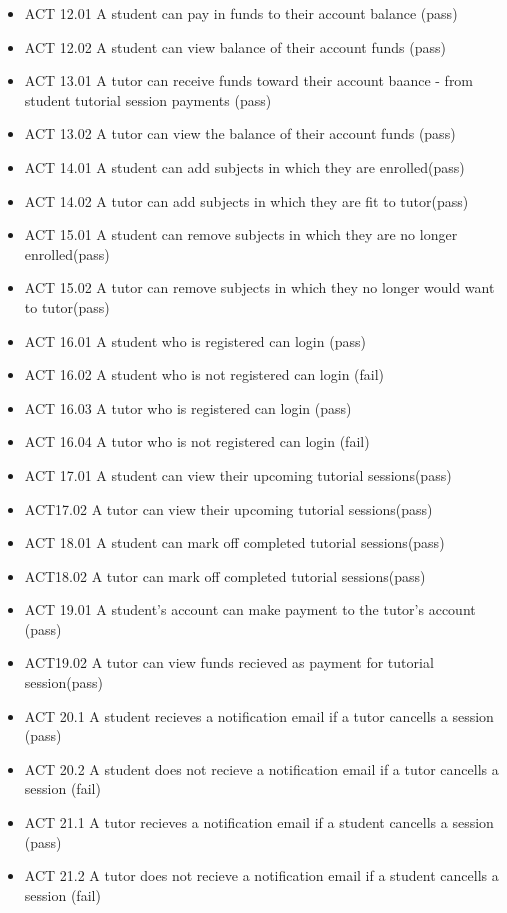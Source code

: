 \documentclass[12pt]{article}
\begin{document}
\begin{itemize}
\item ACT 12.01 A student can pay in funds to their account balance (pass)
\item ACT 12.02 A student can view balance of their account funds (pass)
\item ACT 13.01 A tutor can receive funds toward their account baance - from student tutorial session payments (pass)
\item ACT 13.02 A tutor can view the balance of their account funds (pass)
\item ACT 14.01 A student can add subjects in which they are enrolled(pass)
\item ACT 14.02 A tutor can add subjects in which they are fit to tutor(pass)
\item ACT 15.01 A student can remove subjects in which they are no longer enrolled(pass)
\item ACT 15.02 A tutor can remove subjects in which they no longer would want to tutor(pass)
\item ACT 16.01 A student who is registered can login (pass)
\item ACT 16.02 A student who is not registered can login (fail)
\item ACT 16.03 A tutor who is registered can login (pass)
\item ACT 16.04 A tutor who is not registered can login (fail)
\item ACT 17.01 A student can view their upcoming tutorial sessions(pass)
\item ACT17.02	A tutor can view their upcoming tutorial sessions(pass)
\item ACT 18.01 A student can mark off completed tutorial sessions(pass)
\item ACT18.02	A tutor can mark off completed tutorial sessions(pass)
\item ACT 19.01 A student's account can make payment to the tutor's account (pass)
\item ACT19.02	A tutor can view funds recieved as payment for tutorial session(pass)
\item ACT 20.1 A student recieves a notification email if a tutor cancells a session (pass)
\item ACT 20.2 A student does not recieve a notification email if a tutor cancells a session (fail)
\item ACT 21.1 A tutor recieves a notification email if a student cancells a session (pass)
\item ACT 21.2 A tutor does not recieve a notification email if a student cancells a session (fail)

\end{itemize}
\end{document}
